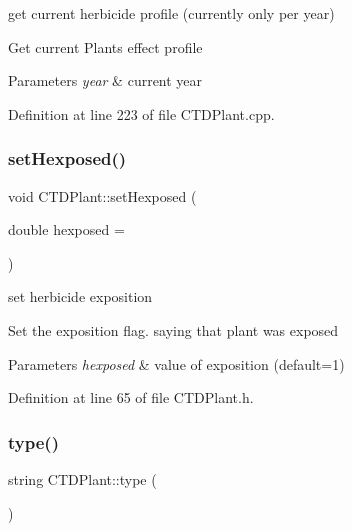 get current herbicide profile (currently only per year) 

Get current Plant\textquotesingle{}s effect profile 
\begin{DoxyParams}{Parameters}
{\em year} & current year \\
\hline
\end{DoxyParams}


Definition at line 223 of file C\+T\+D\+Plant.\+cpp.

\mbox{\label{class_c_t_d_plant_a5fd5e9ad220621ab462a3cef67bd3206}} 
\subsubsection{\texorpdfstring{setHexposed()}{setHexposed()}}
{\footnotesize\ttfamily void C\+T\+D\+Plant\+::set\+Hexposed (\begin{DoxyParamCaption}\item[{double}]{hexposed = {} }\end{DoxyParamCaption})\hspace{0.3cm}{\ttfamily [inline]}}



set herbicide exposition 

Set the exposition flag. saying that plant was exposed 
\begin{DoxyParams}{Parameters}
{\em hexposed} & value of exposition (default=1) \\
\hline
\end{DoxyParams}


Definition at line 65 of file C\+T\+D\+Plant.\+h.

\mbox{\label{class_c_t_d_plant_a4bed9454fd2fd6fa37109b544017361b}} 
\subsubsection{\texorpdfstring{type()}{type()}}
{\footnotesize\ttfamily string C\+T\+D\+Plant\+::type (\begin{DoxyParamCaption}{ }\end{DoxyParamCaption})\hspace{0.3cm}{\ttfamily [virtual]}}



